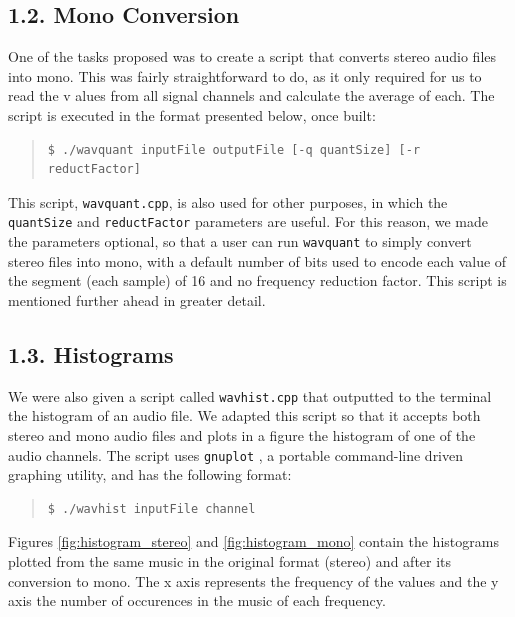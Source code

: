 \documentclass[12pt]{article}
\begin{document}
\subsection*{1.2. Mono Conversion}

One of the tasks proposed was to create a script that converts stereo audio 
files into mono.
This was fairly straightforward to do, as it only required for us to read the v
alues from all signal channels and calculate the average of each.
The script is executed in the format presented below, once built:

\begingroup
\addtolength\leftmargini{-0.4in}
\begin{quote}
\begin{verbatim}
$ ./wavquant inputFile outputFile [-q quantSize] [-r reductFactor]
\end{verbatim}
\end{quote}
\endgroup

This script, \texttt{wavquant.cpp}, is also used for other purposes, in which 
the \texttt{quantSize} and \texttt{reductFactor} parameters are useful.
For this reason, we made the parameters optional, so that a user can run 
\texttt{wavquant} to simply convert stereo files into mono, with a default 
number of bits used to encode each value of the segment (each sample) of 16 and 
no frequency reduction factor.
This script is mentioned further ahead in greater detail.

\subsection*{1.3. Histograms}

We were also given a script called \texttt{wavhist.cpp} that outputted to the 
terminal the histogram of an audio file.
We adapted this script so that it accepts both stereo and mono audio files 
and plots in a figure the histogram of one of the audio channels.
The script uses \texttt{gnuplot} \cite{gnuplot}, a portable command-line driven 
graphing utility, and has the following format:

\begingroup
\addtolength\leftmargini{-0.4in}
\begin{quote}
\begin{verbatim}
$ ./wavhist inputFile channel
\end{verbatim}
\end{quote}
\endgroup

Figures \ref{fig:histogram_stereo} and \ref{fig:histogram_mono} contain the 
histograms plotted from the same music in the original format (stereo) and after 
its conversion to mono. 
The x axis represents the frequency of the values and the y axis the number of 
occurences in the music of each frequency.
\end{document}
